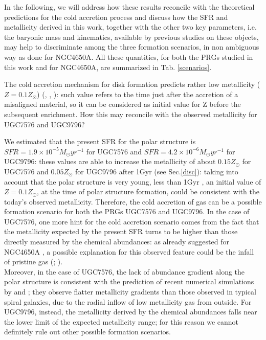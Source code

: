 \documentclass{aa}
\begin{document}
In the following, we will address how these results reconcile with
the theoretical predictions for the cold accretion process and
discuss how the SFR and metallicity derived in this work, together
with the other two key parameters, i.e. the baryonic mass and
kinematics, available by previous studies on these objects, may
help to discriminate among the three formation scenarios, in non
ambiguous way as done for NGC4650A. All these quantities, for both
the PRGs studied in this work and for NGC4650A, are summarized in
Tab. \ref{scenarios}.

The cold accretion mechanism for disk formation predicts rather low
metallicity ($Z=0.1Z_{\odot}$) (\citealt{Dek06}, \citealt{Ocv08},
\citealt{Age09}): such value refers to the time just after the
accretion of a misaligned material, so it can be considered as initial
value for Z before the subsequent enrichment. How this may reconcile
with the observed metallicity for UGC7576 and UGC9796?

We estimated that the present SFR for the polar structure is $SFR =
1.9 \times 10^{-5} M_{\odot} yr^{-1}$ for UGC7576 and $SFR = 4.2
\times 10^{-6} M_{\odot} yr^{-1}$ for UGC9796: these values are able
to increase the metallicity of about $0.15 Z_{\odot}$ for UGC7576 and
$0.05 Z_{\odot}$ for UGC9796 after 1Gyr (see Sec.\ref{disc}): taking
into account that the polar structure is very young, less than 1Gyr
\citep{Res94p}, an initial value of $Z=0.1Z_{\odot}$, at the time of
polar structure formation, could be consistent with the today's
observed metallicity. Therefore, the cold accretion of gas can be a
possible formation scenario for both the PRGs UGC7576 and
UGC9796. In the case of UGC7576, one more hint for the cold
  accretion scenario comes from the fact that the metallicity expected
  by the present SFR turns to be higher than those directly measured
  by the chemical abundances: as already suggested for NGC4650A
  \citep{Spav10}, a possible explanation for this observed feature
  could be the infall of pristine gas (\citealt{Fin07};
  \citealt{Ell08}).\\ Moreover, in the case of UGC7576, the lack of
  abundance gradient along the polar structure is consistent with the
  prediction of recent numerical simulations by \cite{Rup10} and
  \cite{Kew08}; they observe flatter metallicity gradients than those
  observed in typical spiral galaxies, due to the radial inflow of low
  metallicity gas from outside. For UGC9796, instead, the metallicity
  derived by the chemical abundances falls near the lower limit of the
  expected metallicity range; for this reason we cannot definitely
  rule out other possible formation scenarios.
\end{document}
